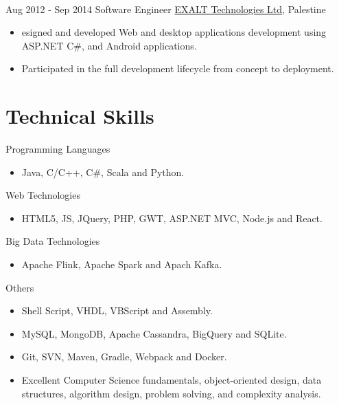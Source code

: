 \documentclass[letterpaper]{twentysecondcv} %
\begin{document}
\begin{twenty}
{{\begin{itemize}
        
    \end{itemize}}
        }
     \\
     \twentyitem
   		{Aug 2012 -}
		{Sep 2014}
        {Software Engineer}
        {}
        {\href{http://www.exalt-tech.com/about/}{EXALT Technologies Ltd}, Palestine}
        {
        \begin{itemize}
        \item esigned and developed Web and desktop applications development using ASP.NET C\#, and Android applications.
        \item Participated in the full development lifecycle from concept to deployment.
        
    \end{itemize}
    	}
        
\end{twenty}

\section{Technical  Skills}
\begin{twenty} %
	\twentyitem
	{}
	{}
	{Programming Languages}
	{}
	{}
	{ \begin{itemize}
			\item Java, C/C++, C\#, Scala and  Python.		
	\end{itemize}}

	\twentyitem
{}
{}
{Web Technologies}
{}
{}
{ \begin{itemize}
		\item HTML5, JS, JQuery, PHP,  GWT, ASP.NET MVC, Node.js and React.	
\end{itemize}}

		\twentyitem
	{}
	{}
	{Big Data Technologies}
	{}
	{}
	{ \begin{itemize}
			\item Apache Flink,  Apache
			Spark and Apach Kafka.		
	\end{itemize}}

		\twentyitem
{}
{}
{Others}
{}
{}
{ \begin{itemize}
		\item Shell Script, VHDL, VBScript and Assembly.	
		\item MySQL, MongoDB, Apache Cassandra, BigQuery and SQLite.
		\item Git, SVN, Maven, Gradle, Webpack and Docker.
		\item Excellent Computer Science fundamentals, object-oriented design, data structures, algorithm design, problem solving, and complexity analysis.	
\end{itemize}}



\end{twenty}
\end{document}
